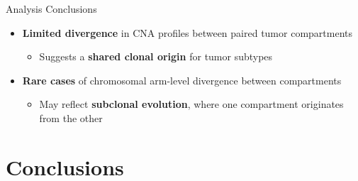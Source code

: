 \documentclass[aspectratio=169]{beamer}
\begin{document}
\begin{frame}{Analysis Conclusions}
    \begin{itemize}
        \item \textbf{Limited divergence} in CNA profiles between paired tumor compartments  
        \begin{itemize} 
            \item Suggests a \textbf{shared clonal origin} for tumor subtypes
        \end{itemize}
        \vspace{0.5cm}
        \item \textbf{Rare cases} of chromosomal arm-level divergence between compartments  
        \begin{itemize} 
            \item May reflect \textbf{subclonal evolution}, where one compartment originates from the other
        \end{itemize}
    \end{itemize}
\end{frame}


\section{Conclusions}

\begin{comment} 
\begin{frame}{Conclusion}
    \begin{block}{Main goal}
        \begin{itemize}
            \item Identify \textbf{genes involved} in transdifferentiation and specific to each tumor subtype.
            \item Identify \textbf{genomic alterations (e.g., CNAs)} potentially driving transdifferentiation and specific to each tumor subtype.
        \end{itemize}
    \end{block}

    \begin{block}{Data}
        \begin{itemize}
            \item \textbf{Spatial transcriptomic data} of metaplastic breast carcinomas using \textbf{Visium} technology.
        \end{itemize}
    \end{block}
\end{frame}
\end{comment} 
\end{document}
